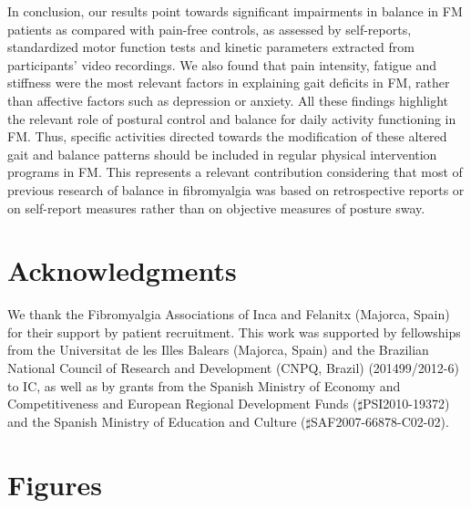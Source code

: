 \documentclass[12pt]{article}
\begin{document}
In conclusion, our results point towards significant impairments in balance in FM patients as compared with pain-free controls, as assessed by self-reports, standardized motor function tests and kinetic parameters extracted from participants’ video recordings. We also found that pain intensity, fatigue and stiffness were the most relevant factors in explaining gait deficits in FM, rather than affective factors such as depression or anxiety. All these findings highlight the relevant role of postural control and balance for daily activity functioning in FM. Thus, specific activities directed towards the modification of these altered gait and balance patterns should be included in regular physical intervention programs in FM. This represents a relevant contribution considering that most of previous research of balance in fibromyalgia was based on retrospective reports or on self-report measures rather than on objective measures of posture sway.



\section*{Acknowledgments}

We thank the Fibromyalgia Associations of Inca and Felanitx (Majorca, Spain) for their support by patient recruitment. This work was supported by fellowships from the Universitat de les Illes Balears (Majorca, Spain) and the Brazilian National Council of Research and Development (CNPQ, Brazil) (201499/2012-6) to IC, as well as by grants from the Spanish Ministry of Economy and Competitiveness and European Regional Development Funds ($\sharp$PSI2010-19372) and the Spanish Ministry of Education and Culture ($\sharp$SAF2007-66878-C02-02).



\vspace{1cm}
\newpage
\section*{Figures}
\end{document}
